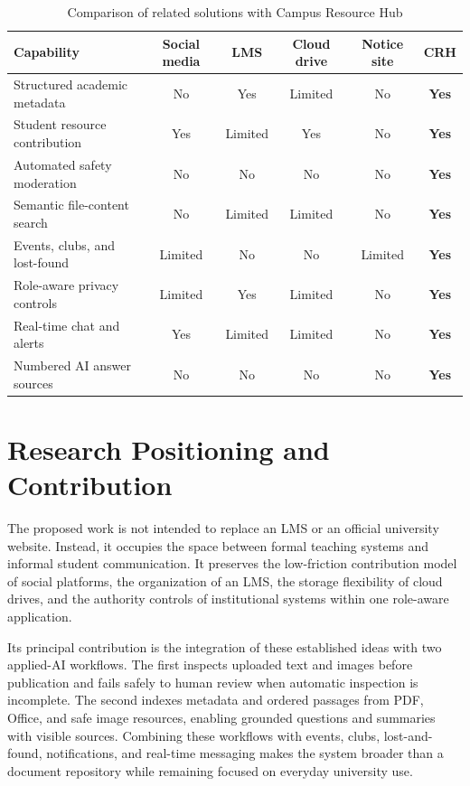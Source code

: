 \documentclass[12pt,a4paper]{report}
\begin{document}
\begin{table}[htbp]
\centering
\caption{Comparison of related solutions with Campus Resource Hub}
\label{tab:related-comparison}
\small
\begin{tabular}{@{}p{3.5cm}ccccc@{}}
\toprule
\textbf{Capability} & \textbf{Social media} & \textbf{LMS} &
\textbf{Cloud drive} & \textbf{Notice site} & \textbf{CRH} \\
\midrule
Structured academic metadata & No & Yes & Limited & No & \textbf{Yes} \\
Student resource contribution & Yes & Limited & Yes & No & \textbf{Yes} \\
Automated safety moderation & No & No & No & No & \textbf{Yes} \\
Semantic file-content search & No & Limited & Limited & No & \textbf{Yes} \\
Events, clubs, and lost-found & Limited & No & No & Limited & \textbf{Yes} \\
Role-aware privacy controls & Limited & Yes & Limited & No & \textbf{Yes} \\
Real-time chat and alerts & Yes & Limited & Limited & No & \textbf{Yes} \\
Numbered AI answer sources & No & No & No & No & \textbf{Yes} \\
\bottomrule
\end{tabular}
\end{table}

\section{Research Positioning and Contribution}
The proposed work is not intended to replace an LMS or an official
university website. Instead, it occupies the space between formal
teaching systems and informal student communication. It preserves
the low-friction contribution model of social platforms, the
organization of an LMS, the storage flexibility of cloud drives,
and the authority controls of institutional systems within one
role-aware application.

Its principal contribution is the integration of these established
ideas with two applied-AI workflows. The first inspects uploaded text
and images before publication and fails safely to human review when
automatic inspection is incomplete. The second indexes metadata and
ordered passages from PDF, Office, and safe image resources, enabling
grounded questions and summaries with visible sources. Combining
these workflows with events, clubs, lost-and-found, notifications,
and real-time messaging makes the system broader than a document
repository while remaining focused on everyday university use.
\end{document}
